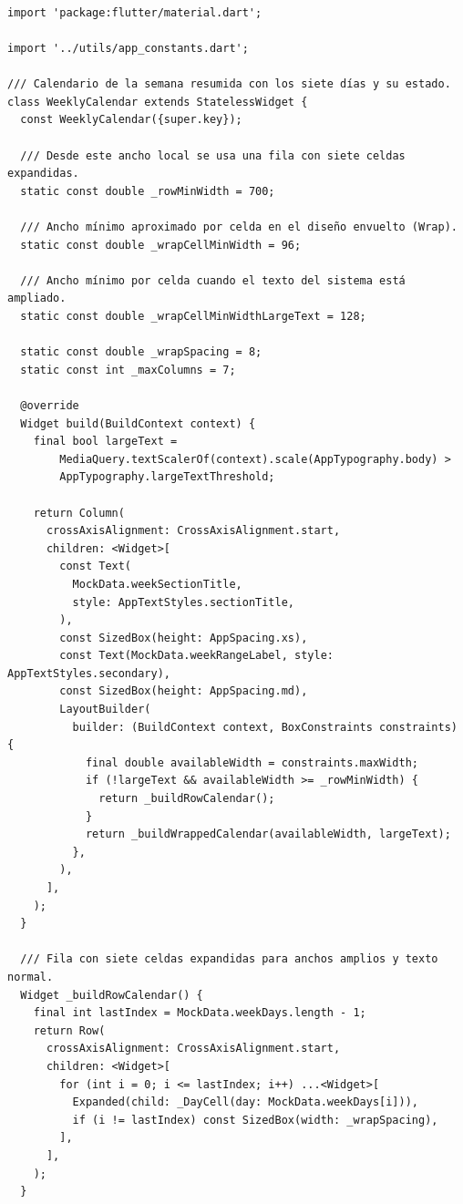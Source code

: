 \documentclass[12pt,a4paper]{article}
\newcommand{\codigo}[1]{\texttt{\detokenize{#1}}}
\begin{document}
\subsubsection*{\codigo{lib/widgets/weekly_calendar.dart}}
\begin{lstlisting}
import 'package:flutter/material.dart';

import '../utils/app_constants.dart';

/// Calendario de la semana resumida con los siete días y su estado.
class WeeklyCalendar extends StatelessWidget {
  const WeeklyCalendar({super.key});

  /// Desde este ancho local se usa una fila con siete celdas expandidas.
  static const double _rowMinWidth = 700;

  /// Ancho mínimo aproximado por celda en el diseño envuelto (Wrap).
  static const double _wrapCellMinWidth = 96;

  /// Ancho mínimo por celda cuando el texto del sistema está ampliado.
  static const double _wrapCellMinWidthLargeText = 128;

  static const double _wrapSpacing = 8;
  static const int _maxColumns = 7;

  @override
  Widget build(BuildContext context) {
    final bool largeText =
        MediaQuery.textScalerOf(context).scale(AppTypography.body) >
        AppTypography.largeTextThreshold;

    return Column(
      crossAxisAlignment: CrossAxisAlignment.start,
      children: <Widget>[
        const Text(
          MockData.weekSectionTitle,
          style: AppTextStyles.sectionTitle,
        ),
        const SizedBox(height: AppSpacing.xs),
        const Text(MockData.weekRangeLabel, style: AppTextStyles.secondary),
        const SizedBox(height: AppSpacing.md),
        LayoutBuilder(
          builder: (BuildContext context, BoxConstraints constraints) {
            final double availableWidth = constraints.maxWidth;
            if (!largeText && availableWidth >= _rowMinWidth) {
              return _buildRowCalendar();
            }
            return _buildWrappedCalendar(availableWidth, largeText);
          },
        ),
      ],
    );
  }

  /// Fila con siete celdas expandidas para anchos amplios y texto normal.
  Widget _buildRowCalendar() {
    final int lastIndex = MockData.weekDays.length - 1;
    return Row(
      crossAxisAlignment: CrossAxisAlignment.start,
      children: <Widget>[
        for (int i = 0; i <= lastIndex; i++) ...<Widget>[
          Expanded(child: _DayCell(day: MockData.weekDays[i])),
          if (i != lastIndex) const SizedBox(width: _wrapSpacing),
        ],
      ],
    );
  }


\end{lstlisting}
\end{document}
